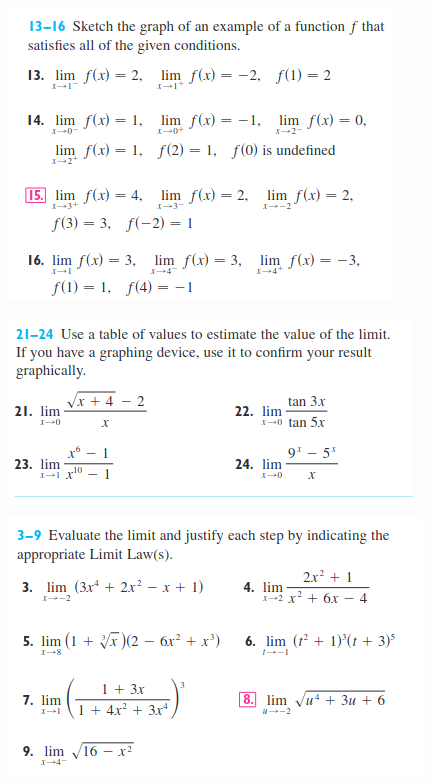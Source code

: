 \documentclass[spanish,12pt,a4paper]{article}
\begin{document}
\begin{itemize}
		
		\begin{figure}[h]
			
			\includegraphics[scale = 0.7]{estimacion_limite.png}\\
			
		\end{figure}
		
		\begin{figure}[h]
			\includegraphics[scale = 0.7]{tabla_limite.png}\\
		\end{figure}

		\begin{figure}[h]
			\includegraphics[scale = 0.7]{propiedades.png}\\
		\end{figure}
		
	\end{itemize}
	
	
\end{document}
